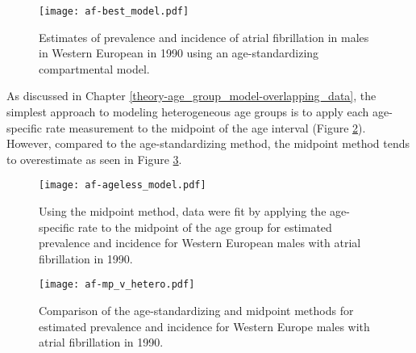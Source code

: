     \begin{figure}[h]
        \begin{center}
            \texttt{[image: af-best\_model.pdf]}
            \caption{Estimates of prevalence and incidence of atrial
              fibrillation in males in Western European in 1990 using
              an age-standardizing compartmental model.}
            \label{fig:app-af age-stand}
        \end{center}
    \end{figure}

As discussed in Chapter \ref{theory-age_group_model-overlapping_data},
the simplest approach to modeling heterogeneous age groups is to apply
each age-specific rate measurement to the midpoint of the age interval
(Figure \ref{fig:app-af mp data}).  However, compared to the
age-standardizing method, the midpoint method tends to overestimate as
seen in Figure \ref{fig:app-af compare}.

    \begin{figure}[h]
        \begin{center}
            \texttt{[image: af-ageless\_model.pdf]}
            \caption{Using the midpoint method, data were fit by
              applying the age-specific rate to the midpoint of the
              age group for estimated prevalence and incidence for
              Western European males with atrial fibrillation in
              1990.}
            \label{fig:app-af mp data}
        \end{center}
    \end{figure}

    \begin{figure}[h]
        \begin{center}
            \texttt{[image: af-mp\_v\_hetero.pdf]}
            \caption{Comparison of the age-standardizing and midpoint
              methods for estimated prevalence and incidence for
              Western Europe males with atrial fibrillation in 1990.}
            \label{fig:app-af compare}
        \end{center}
    \end{figure}
